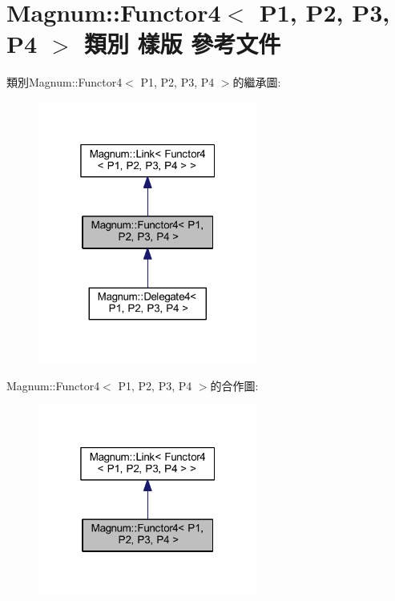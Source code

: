 \hypertarget{class_magnum_1_1_functor4}{}\section{Magnum\+:\+:Functor4$<$ P1, P2, P3, P4 $>$ 類別 樣版 參考文件}
\label{class_magnum_1_1_functor4}


類別\+Magnum\+:\+:Functor4$<$ P1, P2, P3, P4 $>$的繼承圖\+:\nopagebreak
\begin{figure}[H]
\begin{center}
\leavevmode
\includegraphics[width=205pt]{class_magnum_1_1_functor4__inherit__graph}
\end{center}
\end{figure}


Magnum\+:\+:Functor4$<$ P1, P2, P3, P4 $>$的合作圖\+:\nopagebreak
\begin{figure}[H]
\begin{center}
\leavevmode
\includegraphics[width=205pt]{class_magnum_1_1_functor4__coll__graph}
\end{center}
\end{figure}
